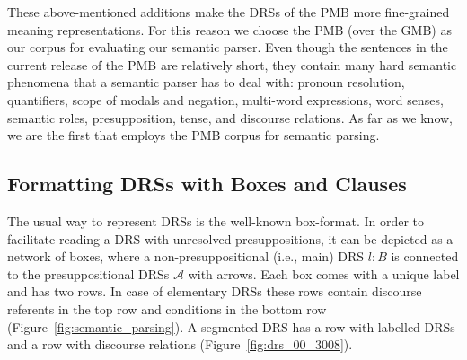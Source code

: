 \documentclass[11pt,a4paper]{article}
\begin{document}
These above-mentioned additions make the DRSs of the PMB more fine-grained meaning representations.
For this reason we choose the PMB (over the GMB) as our corpus for evaluating our semantic parser. Even though the sentences in the current release of the PMB are relatively short, they contain many hard semantic phenomena that a semantic parser has to deal with: pronoun resolution, quantifiers, scope of modals and negation, multi-word expressions, word senses, semantic roles, presupposition, tense, and discourse relations.
As far as we know, we are the first that employs the PMB corpus for semantic parsing.

\subsection{Formatting DRSs with Boxes and Clauses}

The usual way to represent DRSs is the well-known box-format.
In order to facilitate reading a DRS with unresolved presuppositions, it can be depicted as a network of boxes, where a non-presuppositional (i.e., main) DRS $l\!:\!B$ is connected to the presuppositional DRSs $\mathcal{A}$ with arrows.
Each box comes with a unique label and has two rows.
In case of elementary DRSs these rows contain discourse referents in the top row and conditions in the bottom row (Figure~\ref{fig:semantic_parsing}). 
A segmented DRS has a row with labelled DRSs and a row with discourse relations (Figure~\ref{fig:drs_00_3008}).  
\end{document}
